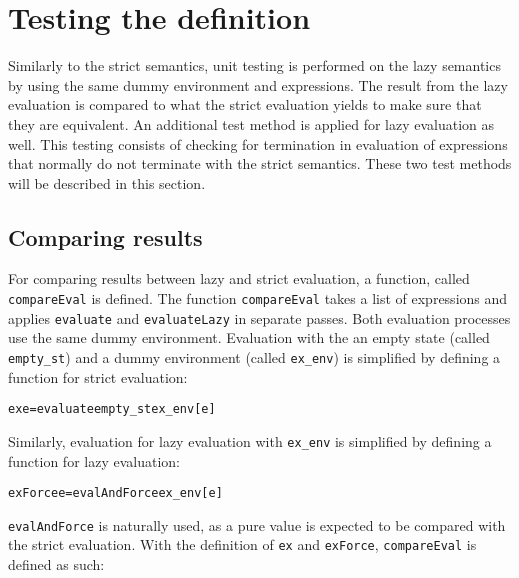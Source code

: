 \section{Testing the definition}

Similarly to the strict semantics, unit testing is performed on the lazy
semantics by using the same dummy environment and expressions. 
The result from the lazy evaluation is compared to what the strict evaluation
yields to make sure that they are equivalent. An additional test method is
applied for lazy evaluation as well. This testing consists of checking for
termination in evaluation of expressions that normally do not terminate with
the strict semantics. These two test methods will be described in this section.

\subsection{Comparing results}
\label{lazy:compres}
For comparing results between lazy and strict evaluation, a function, called
\texttt{compareEval} is defined. The function \texttt{compareEval} takes a list
of expressions and applies \texttt{evaluate} and \texttt{evaluateLazy}
in separate passes. Both evaluation processes use the same dummy environment.
Evaluation with the an empty state (called \texttt{empty\_st}) and
a dummy environment (called \texttt{ex\_env}) is simplified by defining a
function for strict evaluation:

\begin{alltt}
  ex e = evaluate empty_st ex_env [e]
\end{alltt}

\noindent Similarly, evaluation for lazy evaluation with \texttt{ex\_env} is
simplified by defining a function for lazy evaluation:

\begin{alltt}
  exForce e = evalAndForce ex_env [e]
\end{alltt}

\noindent \texttt{evalAndForce} is naturally used, as a pure value is expected
to be compared with the strict evaluation. With the definition of \texttt{ex}
and \texttt{exForce}, \texttt{compareEval} is defined as such:

